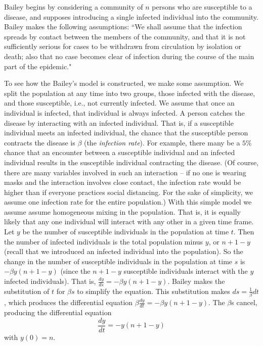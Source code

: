Bailey begins by considering a community of $n$ persons who are susceptible to a disease, and supposes introducing a single infected individual into the community. Bailey makes the following assumptions: ``We shall assume that the infection spreads by contact between the members of the community, and that it is not sufficiently serious for cases to be withdrawn from circulation by isolation or death; also that no case becomes clear of infection during the course of the main part of the epidemic."

To see how the Bailey's model is constructed, we make some assumption. We split the population at any time into two groups, those infected with the disease, and those susceptible, i.e., not currently infected. We assume that once an individual is infected, that individual is always infected. A person catches the disease by interacting with an infected individual. That is, if a susceptible individual meets an infected individual, the chance that the susceptible person contracts the disease is $\beta$ (the \emph{infection rate}). For example, there many be a $5\%$ chance that an encounter between a susceptible individual and an infected individual results in the susceptible individual contracting the disease. (Of course, there are many variables involved in such an interaction -- if no one is wearing masks and the interaction involves close contact, the infection rate would be higher than if everyone practices social distancing. For the sake of simplicity, we assume one infection rate for the entire population.) With this simple model we assume assume homogeneous mixing in the population. That is, it is equally likely that any one individual will interact with any other in a given time frame. Let $y$ be the number of susceptible individuals in the population at time $t$. Then the number of infected individuals is the total population minus $y$, or $n+1-y$ (recall that we introduced an infected individual into the population). So the change in the number of susceptible individuals in the population at time $s$ is $-\beta y(n+1-y)$ (since the $n+1-y$ susceptible individuals interact with the $y$ infected individuals). That is, $\frac{dy}{ds} = -\beta y (n+1-y)$. Bailey makes the substitution of $t$ for $\beta s$ to simplify the equation. This substitution makes $ds = \frac{1}{\beta} dt$, which produces the differential equation $\beta \frac{dy}{dt} =  -\beta y (n+1-y)$. The $\beta$s cancel, producing the differential equation
\begin{equation} \label{eq:Bailey_1}
\frac{dy}{dt} = -y(n+1-y)
\end{equation}
with $y(0) = n$. 

